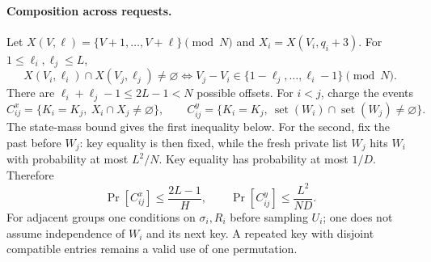 \documentclass[journal=tosc,preprint,floatrow,nohyperxmp]{iacrtrans}
\newif\ifjordireview
\newcounter{jordinote}
\newcommand{\jordinote}[2]{%
  \ifjordireview
  \stepcounter{jordinote}\par\medskip\noindent
  \fcolorbox{blue!55!black}{blue!4}{%
    \begin{minipage}{\dimexpr\linewidth-2\fboxsep-2\fboxrule\relax}
    \small\raggedright\color{blue!45!black}
    \textbf{Solo Jordi -- J\thejordinote: #1}\par\smallskip
    #2
    \end{minipage}}\par\medskip
  \fi
}
\numberwithin{lemma}{section}
\numberwithin{proposition}{section}
\numberwithin{equation}{section}
\theoremstyle{definition}
\numberwithin{definition}{section}
\theoremstyle{plain}
\begin{document}
\paragraph{Composition across requests.}
Let $X(V,\ell)=\{V+1,\ldots,V+\ell\}\pmod N$ and $X_i=X(V_i,q_i+3)$. For $1\le\ell_i,\ell_j\le L$,
\begin{equation}
 X(V_i,\ell_i)\cap X(V_j,\ell_j)\ne\varnothing
 \iff V_j-V_i\in\{1-\ell_j,\ldots,\ell_i-1\}\pmod N.
 \label{eq:interval-intersection}
\end{equation}
There are $\ell_i+\ell_j-1\le2L-1<N$ possible offsets. For $i<j$, charge the events
\[
 C^x_{ij}=\{K_i=K_j,\ X_i\cap X_j\ne\varnothing\},\qquad
 C^y_{ij}=\{K_i=K_j,\ \operatorname{set}(W_i)\cap\operatorname{set}(W_j)\ne\varnothing\}.
\]
The state-mass bound gives the first inequality below. For the second, fix the past before $W_j$: key equality is then fixed, while the fresh private list $W_j$ hits $W_i$ with probability at most $L^2/N$. Key equality has probability at most $1/D$. Therefore
\begin{equation}
 \Pr[C^x_{ij}]\le\frac{2L-1}{H},\qquad
 \Pr[C^y_{ij}]\le\frac{L^2}{ND}.
 \label{eq:main-conflicts}
\end{equation}
For adjacent groups one conditions on $\sigma_i,R_i$ before sampling $U_i$; one does not assume independence of $W_i$ and its next key. A repeated key with disjoint compatible entries remains a valid use of one permutation.

\jordinote{Dónde se esconde la dependencia entre claves}{Este es un punto delicado: la salida final de un grupo determina la clave del siguiente. Para grupos adyacentes, revisa qué se fija antes de muestrear la terna y cuándo se toma cada esperanza. No basta escribir que las claves son independientes. Tampoco cobramos toda repetición de clave como fallo: contamos posibles conflictos por intersecciones de entradas o salidas. Algunas coincidencias compatibles también se cobran conservadoramente en la cota.}
\end{document}
